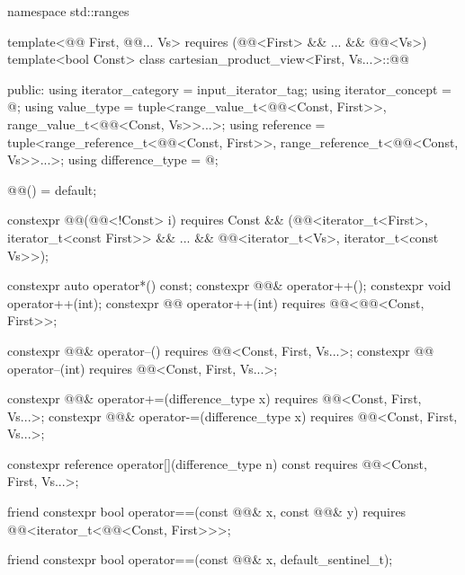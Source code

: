 \begin{codeblock}
namespace std::ranges {
  template<@@ First, @@... Vs>
    requires (@@<First> && ... && @@<Vs>)
  template<bool Const>
  class cartesian_product_view<First, Vs...>::@@ {
  public:
    using iterator_category = input_iterator_tag;
    using iterator_concept  = @\seebelow@;
    using value_type = tuple<range_value_t<@@<Const, First>>,
      range_value_t<@@<Const, Vs>>...>;
    using reference = tuple<range_reference_t<@@<Const, First>>,
      range_reference_t<@@<Const, Vs>>...>;
    using difference_type = @\seebelow@;

    @@() = default;

    constexpr @@(@@<!Const> i) requires Const &&
      (@@<iterator_t<First>, iterator_t<const First>> &&
        ... && @@<iterator_t<Vs>, iterator_t<const Vs>>);

    constexpr auto operator*() const;
    constexpr @@& operator++();
    constexpr void operator++(int);
    constexpr @@ operator++(int) requires @@<@@<Const, First>>;

    constexpr @@& operator--()
      requires @@<Const, First, Vs...>;
    constexpr @@ operator--(int)
      requires @@<Const, First, Vs...>;

    constexpr @@& operator+=(difference_type x)
      requires @@<Const, First, Vs...>;
    constexpr @@& operator-=(difference_type x)
      requires @@<Const, First, Vs...>;

    constexpr reference operator[](difference_type n) const
      requires @@<Const, First, Vs...>;

    friend constexpr bool operator==(const @@& x, const @@& y)
      requires @@<iterator_t<@@<Const, First>>>;

    friend constexpr bool operator==(const @@& x, default_sentinel_t);

}}
\end{codeblock}
